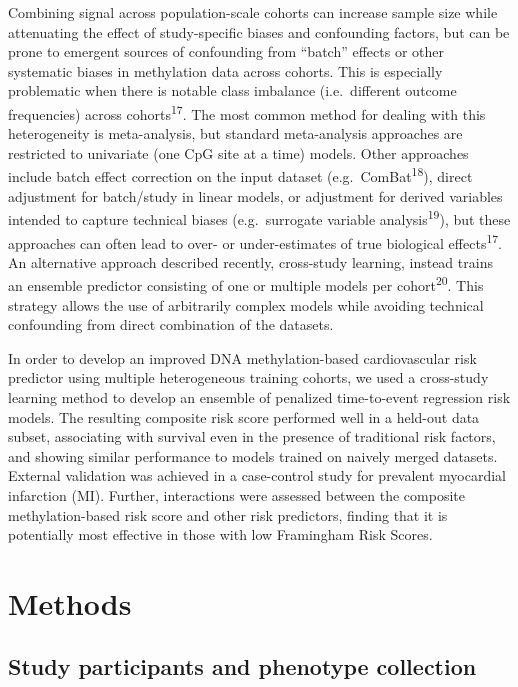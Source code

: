 \documentclass[]{article}
\begin{document}
Combining signal across population-scale cohorts can increase sample
size while attenuating the effect of study-specific biases and
confounding factors, but can be prone to emergent sources of confounding
from ``batch'' effects or other systematic biases in methylation data
across cohorts. This is especially problematic when there is notable
class imbalance (i.e.~different outcome frequencies) across
cohorts\textsuperscript{17}. The most common method for dealing with
this heterogeneity is meta-analysis, but standard meta-analysis
approaches are restricted to univariate (one CpG site at a time) models.
Other approaches include batch effect correction on the input dataset
(e.g.~ComBat\textsuperscript{18}), direct adjustment for batch/study in
linear models, or adjustment for derived variables intended to capture
technical biases (e.g.~surrogate variable analysis\textsuperscript{19}),
but these approaches can often lead to over- or under-estimates of true
biological effects\textsuperscript{17}. An alternative approach
described recently, cross-study learning, instead trains an ensemble
predictor consisting of one or multiple models per
cohort\textsuperscript{20}. This strategy allows the use of arbitrarily
complex models while avoiding technical confounding from direct
combination of the datasets.

In order to develop an improved DNA methylation-based cardiovascular
risk predictor using multiple heterogeneous training cohorts, we used a
cross-study learning method to develop an ensemble of penalized
time-to-event regression risk models. The resulting composite risk score
performed well in a held-out data subset, associating with survival even
in the presence of traditional risk factors, and showing similar
performance to models trained on naively merged datasets. External
validation was achieved in a case-control study for prevalent myocardial
infarction (MI). Further, interactions were assessed between the
composite methylation-based risk score and other risk predictors,
finding that it is potentially most effective in those with low
Framingham Risk Scores.

\hypertarget{methods}{%
\section{Methods}\label{methods}}

\hypertarget{study-participants-and-phenotype-collection}{%
\subsection{Study participants and phenotype
collection}\label{study-participants-and-phenotype-collection}}
\end{document}
